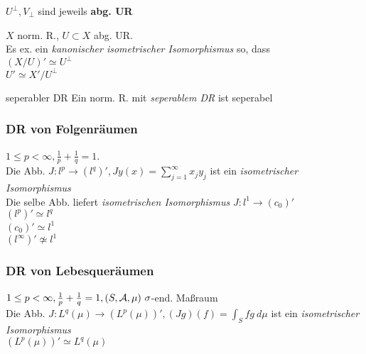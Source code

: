 \begin{bemerkung}
  $U^{\perp}, V_{\perp}$ sind jeweils \textbf{abg. UR}
\end{bemerkung}

\fheel


$X$ norm. R., $U\subset X$ abg. UR.\\
Es ex. ein \textit{kanonischer isometrischer Isomorphismus} so, dass\\
$(X/U)' \simeq U^{\perp}$\\
$ U' \simeq X'/U^{\perp}$\\

\begin{satz}{seperabler DR}
  Ein norm. R. mit \textit{seperablem DR} ist seperabel
\end{satz}

\subsubsection*{DR von Folgenräumen}

$1\leq p < \infty, \frac{1}{p}+\frac{1}{q} = 1$.\\
Die Abb. $J:l^p \to (l^q)', Jy(x)=\sum_{j=1}^\infty x_jy_j$ ist ein
\textit{isometrischer Isomorphismus}\\
Die selbe Abb. liefert \textit{isometrischen Isomorphismus} $J:l^1 \to (c_0)'$\\
$(l^p)' \simeq l^q$\\
$(c_0)' \simeq l^1$\\
$(l^\infty)' \not\simeq l^1$

\subsubsection*{DR von Lebesqueräumen}
$1\leq p < \infty, \frac{1}{p}+\frac{1}{q} = 1, (S,\mathcal{A},\mu)\
\sigma$-end. Maßraum\\
Die Abb. $J: L^q(\mu) \to (L^p(\mu))', (Jg)(f) = \int_S fg\ d\mu$ ist ein
\textit{isometrischer Isomorphismus}\\
$(L^p(\mu))' \simeq L^q(\mu)$
